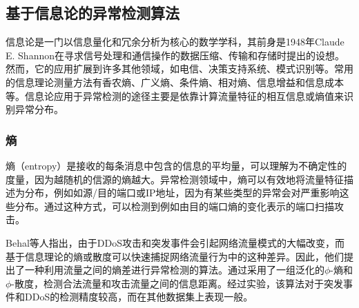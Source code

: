 




\subsection{基于信息论的异常检测算法}

信息论是一门以信息量化和冗余分析为核心的数学学科，其前身是1948年Claude E. Shannon在寻求信号处理和通信操作的数据压缩、传输和存储时提出的设想\cite{shannon1948mathematical}。然而，它的应用扩展到许多其他领域，如电信、决策支持系统、模式识别等。常用的信息理论测量方法有香农熵、广义熵、条件熵、相对熵、信息增益和信息成本等。信息论应用于异常检测的途径主要是依靠计算流量特征的相互信息或熵值来识别异常分布。

\subsubsection{熵}
熵（entropy）是接收的每条消息中包含的信息的平均量，可以理解为不确定性的度量，因为越随机的信源的熵越大。异常检测领域中，熵可以有效地将流量特征描述为分布，例如如源/目的端口或IP地址，因为有某些类型的异常会对严重影响这些分布。通过这种方式，可以检测到例如由目的端口熵的变化表示的端口扫描攻击。

Behal等人\cite{behal2017detection}指出，由于DDoS攻击和突发事件会引起网络流量模式的大幅改变，而基于信息理论的熵或散度可以快速捕捉网络流量行为中的这种差异。因此，他们提出了一种利用流量之间的熵差进行异常检测的算法。通过采用了一组泛化的$\phi$-熵和$\phi$-散度，检测合法流量和攻击流量之间的信息距离。经过实验，该算法对于突发事件和DDoS的检测精度较高，而在其他数据集上表现一般。

